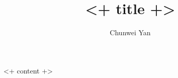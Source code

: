 \documentclass[a4paper]{ctexart}
\author{Chunwei Yan}
\title{<+ title +>}
\begin{document}
    \maketitle
\begin{multicols}{2}
<+ content +>
\end{multicols}
\end{document}
